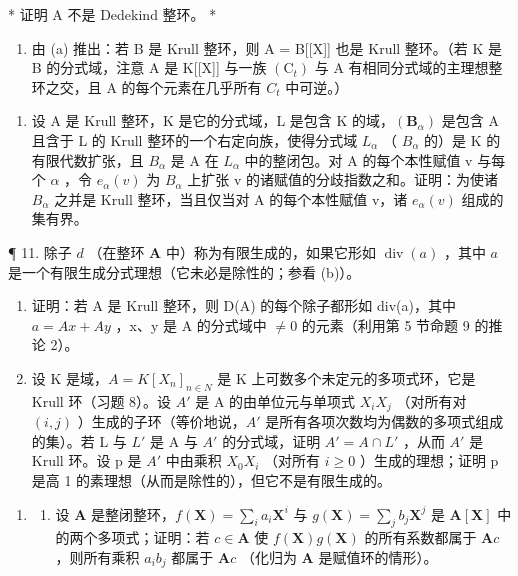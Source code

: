 * 证明 A 不是 Dedekind 整环。 *

\begin{enumerate}
\def\labelenumi{(\alph{enumi})}
\setcounter{enumi}{1}
\tightlist
\item
  由 (a) 推出：若 B 是 Krull 整环，则 A = B{[}{[}X{]}{]} 也是 Krull 整环。（若 K 是 B 的分式域，注意 A 是 K{[}{[}X{]}{]} 与一族 \((\mathrm{C}_{t})\) 与 A 有相同分式域的主理想整环之交，且 A 的每个元素在几乎所有 \(C_{t}\) 中可逆。）
\end{enumerate}

\begin{enumerate}
\def\labelenumi{\arabic{enumi}.}
\setcounter{enumi}{9}
\tightlist
\item
  设 A 是 Krull 整环，K 是它的分式域，L 是包含 K 的域，\((\mathbf{B}_{\alpha})\) 是包含 A 且含于 L 的 Krull 整环的一个右定向族，使得分式域 \(L_{\alpha}\) （ \(B_{\alpha}\) 的）是 K 的有限代数扩张，且 \(B_{\alpha}\) 是 A 在 \(L_{\alpha}\) 中的整闭包。对 A 的每个本性赋值 v 与每个 \(\alpha\) ，令 \(e_{\alpha}(v)\) 为 \(B_{\alpha}\) 上扩张 v 的诸赋值的分歧指数之和。证明：为使诸 \(B_{\alpha}\) 之并是 Krull 整环，当且仅当对 A 的每个本性赋值 v，诸 \(e_{\alpha}(v)\) 组成的集有界。
\end{enumerate}

¶ 11. 除子 \(d\) （在整环 \(\mathbf{A}\) 中）称为有限生成的，如果它形如 \(\operatorname{div}(a)\) ，其中 \(a\) 是一个有限生成分式理想（它未必是除性的；参看 (b)）。

\begin{enumerate}
\def\labelenumi{(\alph{enumi})}
\item
    证明：若 A 是 Krull 整环，则 D(A) 的每个除子都形如 div(a)，其中 \(a = Ax + Ay\) ，x、y 是 A 的分式域中 \(\neq 0\) 的元素（利用第 5 节命题 9 的推论 2）。
\item
  设 K 是域，\(A = K[X_{n}]_{n \in N}\) 是 K 上可数多个未定元的多项式环，它是 Krull 环（习题 8）。设 \(A'\) 是 A 的由单位元与单项式 \(X_{i}X_{j}\) （对所有对 \((i,j)\) ）生成的子环（等价地说，\(A'\) 是所有各项次数均为偶数的多项式组成的集）。若 L 与 \(L'\) 是 A 与 \(A'\) 的分式域，证明 \(A' = A \cap L'\) ，从而 \(A'\) 是 Krull 环。设 p 是 \(A'\) 中由乘积 \(X_{0}X_{i}\) （对所有 \(i \geqslant 0\) ）生成的理想；证明 p 是高 1 的素理想（从而是除性的），但它不是有限生成的。
\end{enumerate}

\begin{enumerate}
\def\labelenumi{\arabic{enumi}.}
\setcounter{enumi}{11}
\tightlist
\item
  \begin{enumerate}
  \def\labelenumii{(\alph{enumii})}
  \tightlist
  \item
    设 \(\mathbf{A}\) 是整闭整环，\(f(\mathbf{X}) = \sum_{i} a_i \mathbf{X}^i\) 与 \(g(\mathbf{X}) = \sum_{j} b_j \mathbf{X}^j\) 是 \(\mathbf{A}[\mathbf{X}]\) 中的两个多项式；证明：若 \(c \in \mathbf{A}\) 使 \(f(\mathbf{X}) g(\mathbf{X})\) 的所有系数都属于 \(\mathbf{A}c\) ，则所有乘积 \(a_i b_j\) 都属于 \(\mathbf{A}c\) （化归为 \(\mathbf{A}\) 是赋值环的情形）。
  \end{enumerate}
\end{enumerate}

